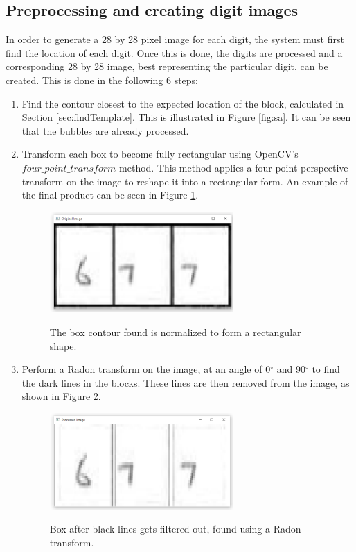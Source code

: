 \subsection{Preprocessing and creating digit images}
\label{sec:preprocess}

In order to generate a 28 by 28 pixel image for each digit, the system must first find the location of each digit. Once this is done, the digits are processed and a corresponding 28 by 28 image, best representing the particular digit, can be created. This is done in the following 6 steps:

\begin{enumerate}
\item Find the contour closest to the expected location of the block, calculated in Section \ref{sec:findTemplate}. This is illustrated in Figure \ref{fig:sa}. It can be seen that the bubbles are already processed.

\item Transform each box to become fully rectangular using OpenCV's $four\_point\_transform$ method. This method applies a four point perspective transform on the image to reshape it into a rectangular form. An example of the final product can be seen in Figure \ref{fig:bp}.

\begin{figure}
  \centering
  \includegraphics[width=7cm]{BeforeProcessing}\\
  \caption{The box contour found is normalized to form a rectangular shape.}
  \label{fig:bp}
\end{figure}

\item Perform a Radon transform on the image, at an angle of 0$^{\circ}$ and 90$^{\circ}$ to find the dark lines in the blocks. These lines are then removed from the image, as shown in Figure \ref{fig:ar}. 

\begin{figure}
  \centering
  \includegraphics[width=7cm]{AfterRadon}\\
  \caption{Box after black lines gets filtered out, found using a Radon transform.}
  \label{fig:ar}
\end{figure}


\end{enumerate}
